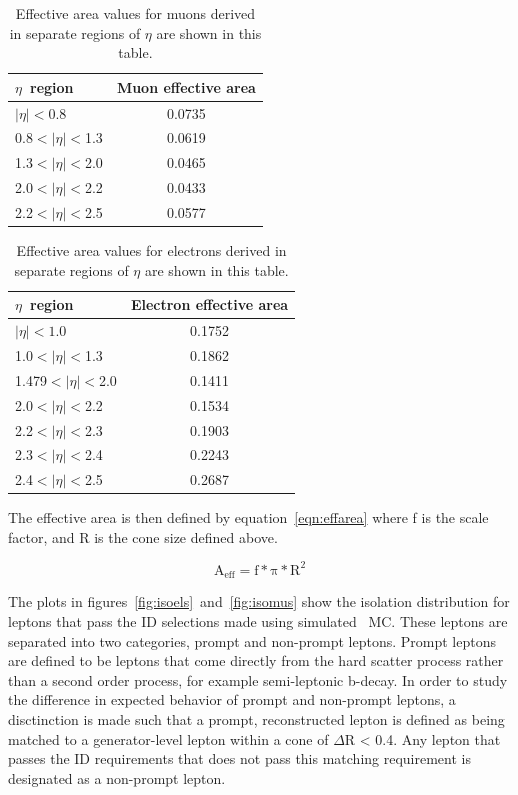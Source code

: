 \begin{table}[htb]
\begin{center}
  \caption{
    \label{tab:eamus}
    Effective area values for muons derived in separate regions of $\eta$ are shown in this table.
  }
\begin{tabular}{l|c}
\hline
\hline
$\eta$~region        & Muon effective area \\
\hline
$|\eta| < 0.8$       & 0.0735 \\
0.8$ < |\eta| < $1.3 & 0.0619 \\
1.3$ < |\eta| < $2.0 & 0.0465 \\
2.0$ < |\eta| < $2.2 & 0.0433 \\
2.2$ < |\eta| < $2.5 & 0.0577 \\
\hline
\hline
\end{tabular}
\end{center}
\end{table}

\begin{table}[htb]
\begin{center}
  \caption{
    \label{tab:eaels}
    Effective area values for electrons derived in separate regions of $\eta$ are shown in this table.
  }
\begin{tabular}{l|c}
\hline
\hline
$\eta$~region          & Electron effective area \\
\hline
$|\eta| < 1.0$         & 0.1752 \\
1.0$ < |\eta| < $1.3   & 0.1862 \\
1.479$ < |\eta| < $2.0 & 0.1411 \\
2.0$ < |\eta| < $2.2   & 0.1534 \\
2.2$ < |\eta| < $2.3   & 0.1903 \\
2.3$ < |\eta| < $2.4   & 0.2243 \\
2.4$ < |\eta| < $2.5   & 0.2687 \\
\hline
\hline
\end{tabular}
\end{center}
\end{table}

The effective area is then defined by equation~\ref{eqn:effarea} where f is the scale factor, and R is the cone size defined above.

\begin{equation}
\label{eqn:effarea}
\mathrm{A_{eff} = f*\pi * R^2}
\end{equation}

The plots in figures~\ref{fig:isoels}~and~\ref{fig:isomus}
show the isolation distribution for leptons that pass the ID selections made using simulated \zjets\ MC.
These leptons are separated into two categories, prompt and non-prompt leptons.
Prompt leptons are defined to be leptons that come directly from the hard scatter process rather than a second order process, for example semi-leptonic b-decay.
In order to study the difference in expected behavior of prompt and non-prompt leptons, a disctinction is made such that a prompt,
reconstructed lepton is defined as being matched to a generator-level lepton within a cone of $\Delta$R < 0.4.
Any lepton that passes the ID requirements that does not pass this matching requirement is designated as a non-prompt lepton.


